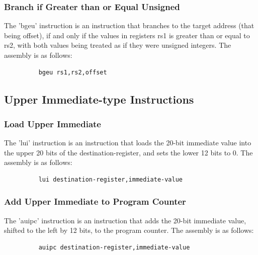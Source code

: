 \subsubsection{Branch if Greater than or Equal Unsigned}
\qquad
The 'bgeu' instruction is an instruction that branches to the target address (that being offset), if and only if the values in registers rs1 is greater than or equal to rs2, with both values being treated as if they were unsigned integers. The assembly is as follows:
\begin{figure}[!htbp]
    \centering
    \begin{verbatim}
    bgeu rs1,rs2,offset
    \end{verbatim}
\end{figure}\newline


\subsection{Upper Immediate-type Instructions}

\subsubsection{Load Upper Immediate}
\qquad
The 'lui' instruction is an instruction that loads the 20-bit immediate value into the upper 20 bits of the destination-register, and sets the lower 12 bits to 0. The assembly is as follows:
\begin{figure}[!htbp]
    \centering
    \begin{verbatim}
    lui destination-register,immediate-value
    \end{verbatim}
\end{figure}\newline

\subsubsection{Add Upper Immediate to Program Counter}
\qquad
The 'auipc' instruction is an instruction that adds the 20-bit immediate value, shifted to the left by 12 bits, to the program counter. The assembly is as follows:
\begin{figure}[!htbp]
    \centering
    \begin{verbatim}
    auipc destination-register,immediate-value
    \end{verbatim}
\end{figure}\newline


